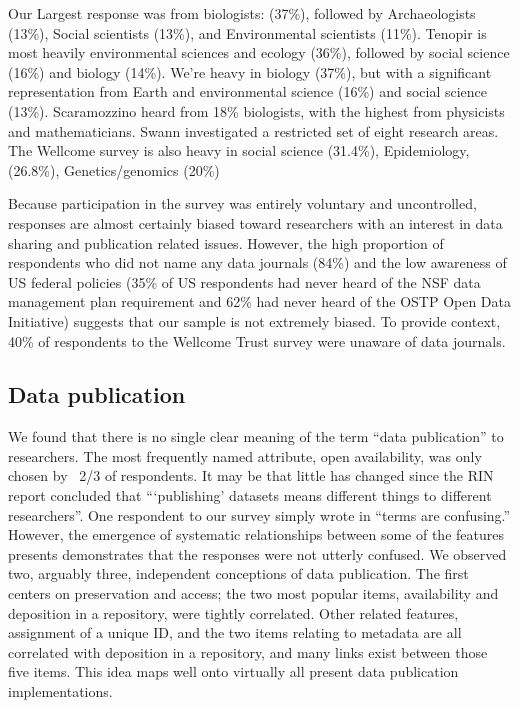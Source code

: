 \documentclass[10pt]{article}
\begin{document}
Our Largest response was from biologists: (37\%), followed by Archaeologists (13\%), Social scientists (13\%), and Environmental scientists (11\%). 
Tenopir is most heavily environmental sciences and ecology (36\%), followed by social science (16\%) and biology (14\%). 
We're heavy in biology (37\%), but with a significant representation from Earth and environmental science (16\%) and social science (13\%). 
Scaramozzino heard from 18\% biologists, with the highest from physicists and mathematicians.
Swann investigated a restricted set of eight research areas.
The Wellcome survey is also heavy in social science (31.4\%), Epidemiology, (26.8\%), Genetics/genomics (20\%)

Because participation in the survey was entirely voluntary and uncontrolled, responses are almost certainly biased toward researchers with an interest in data sharing and publication related issues.
However, the high proportion of respondents who did not name any data journals (84\%) and the low awareness of US federal policies (35\% of US respondents had never heard of the NSF data management plan requirement and 62\% had never heard of the OSTP Open Data Initiative) suggests that our sample is not extremely biased.
To provide context, 40\% of respondents to the Wellcome Trust survey were unaware of data journals.


\subsection*{Data publication}

We found that there  is no single clear meaning of the term ``data publication'' to researchers.
The most frequently named attribute, open availability, was only chosen by ~2/3 of respondents.
It may be that little has changed since the RIN report concluded that ```publishing' datasets means different things to different researchers''\cite{swan_share_2008}.
One respondent to our survey simply wrote in ``terms are confusing.''
However, the emergence of systematic relationships between some of the features presents demonstrates that the responses were not utterly confused.
We observed two, arguably three, independent conceptions of data publication.
The first centers on preservation and access; the two most popular items, availability and deposition in a repository, were tightly correlated.
Other related features, assignment of a unique ID, and the two items relating to metadata are all correlated with deposition in a repository, and many links exist between those five items.
This idea maps well onto virtually all present data publication implementations.
\end{document}
